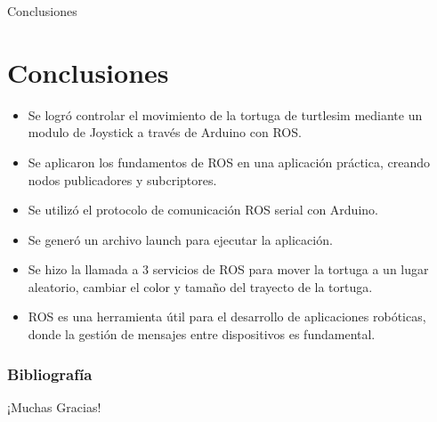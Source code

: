 \documentclass[xcolor=x11names,t]{beamer}
\begin{document}
\begin{frame}{Conclusiones}
    \section{Conclusiones} 
    \begin{itemize}
        \item Se logró controlar el movimiento de la tortuga de turtlesim mediante un modulo de Joystick a través de Arduino con ROS.
        \item Se aplicaron los fundamentos de ROS en una aplicación práctica, creando nodos publicadores y subcriptores.
        \item Se utilizó el protocolo de comunicación ROS serial con Arduino.
        \item Se generó un archivo launch para ejecutar la aplicación.
        \item Se hizo la llamada a 3 servicios de ROS para mover la tortuga a un lugar aleatorio, cambiar el color y tamaño del trayecto de la tortuga.
        \item ROS es una herramienta útil para el desarrollo de aplicaciones robóticas, donde la gestión de mensajes entre dispositivos es fundamental.
    \end{itemize} 
\end{frame}


\begin{frame}
    \frametitle{Bibliografía}
    \nocite{clase,ros}
    \printbibliography
  \end{frame}


\begin{frame}
    \vspace*{3cm}
    \begin{center}
        \Huge ¡Muchas Gracias!
    \end{center}
\end{frame}
\end{document}
